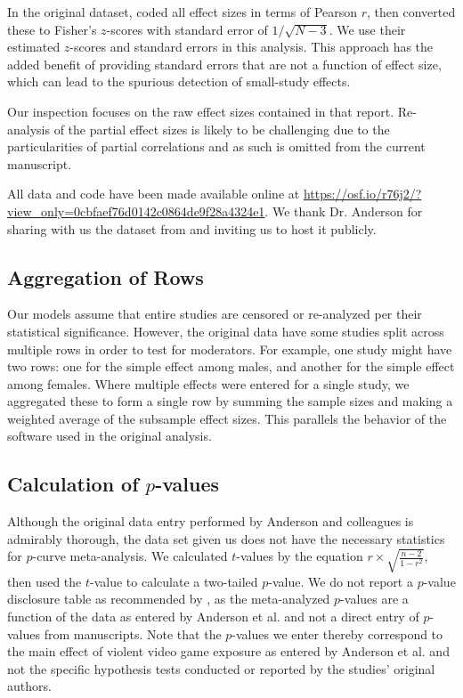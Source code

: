 \documentclass[man, mask]{apa6}
\begin{document}
In the original dataset, \citet{Anderson:etal:2010} coded all effect sizes in terms of Pearson $r$, then converted these to Fisher's $z$-scores with standard error of $1/\sqrt{N-3}$. We use their estimated $z$-scores and standard errors in this analysis. This approach has the added benefit of providing standard errors that are not a function of effect size, which can lead to the spurious detection of small-study effects.

Our inspection focuses on the raw effect sizes contained in that report. Re-analysis of the partial effect sizes is likely to be challenging due to the particularities of partial correlations \citep[see, e.g.,][]{Aloe:2014} and as such is omitted from the current manuscript.

All data and code have been made available online at \url{https://osf.io/r76j2/?view\_only=0cbfaef76d0142c0864de9f28a4324e1}. We thank Dr. Anderson for sharing with us the dataset from \citet{Anderson:etal:2010} and inviting us to host it publicly. 

\subsection{Aggregation of Rows}
Our models assume that entire studies are censored or re-analyzed per their statistical significance. However, the original data have some studies split across multiple rows in order to test for moderators. For example, one study might have two rows: one for the simple effect among males, and another for the simple effect among females. Where multiple effects were entered for a single study, we aggregated these to form a single row by summing the sample sizes and making a weighted average of the subsample effect sizes. This parallels the behavior of the software used in the original analysis. 

\subsection{Calculation of $p$-values}
Although the original data entry performed by Anderson and colleagues is admirably thorough, the data set given us does not have the necessary statistics for $p$-curve meta-analysis. We calculated $t$-values by the equation $r \times \sqrt{\frac{n-2}{1-r^2}}$, then used the $t$-value to calculate a two-tailed $p$-value. We do not report a $p$-value disclosure table as recommended by \citet{Simonsohn:etal:2014}, as the meta-analyzed $p$-values are a function of the data as entered by Anderson et al. and not a direct entry of $p$-values from manuscripts.
Note that the $p$-values we enter thereby correspond to the main effect of violent video game exposure as entered by Anderson et al. and not the specific hypothesis tests conducted or reported by the studies' original authors.
\end{document}
